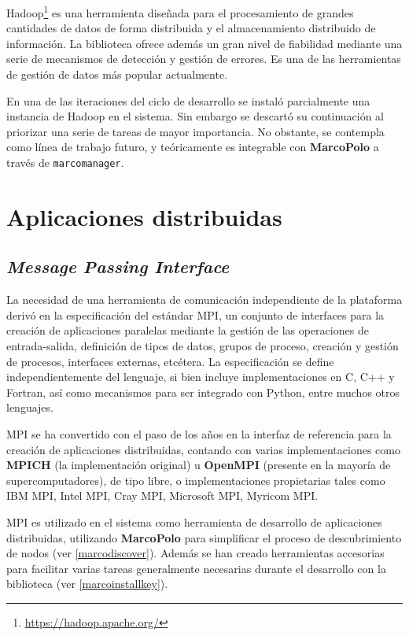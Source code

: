 Hadoop\footnote{\href{https://hadoop.apache.org/}{https://hadoop.apache.org/}} es una herramienta diseñada para el procesamiento de grandes cantidades de datos de forma distribuida y el almacenamiento distribuido de información. La biblioteca ofrece además un gran nivel de fiabilidad mediante una serie de mecanismos de detección y gestión de errores. Es una de las herramientas de gestión de datos más popular actualmente.

En una de las iteraciones del ciclo de desarrollo se instaló parcialmente una instancia de Hadoop en el sistema. Sin embargo se descartó su continuación al priorizar una serie de tareas de mayor importancia. No obstante, se contempla como línea de trabajo futuro, y teóricamente es integrable con \textbf{MarcoPolo} a través de \texttt{marcomanager}.

\section{Aplicaciones distribuidas}

\subsection{\textit{Message Passing Interface}}

La necesidad de una herramienta de comunicación independiente de la plataforma derivó en la especificación del estándar MPI\cite{MPISpec}, un conjunto de interfaces para la creación de aplicaciones paralelas mediante la gestión de las operaciones de entrada-salida, definición de tipos de datos, grupos de proceso, creación y gestión de procesos, interfaces externas, etcétera. La especificación se define independientemente del lenguaje, si bien incluye implementaciones en C, C++ y Fortran, así como mecanismos para ser integrado con Python, entre muchos otros lenguajes.

MPI se ha convertido con el paso de los años en la interfaz de referencia para la creación de aplicaciones distribuidas, contando con varias implementaciones como \textbf{MPICH} (la implementación original) u \textbf{OpenMPI} (presente en la mayoría de supercomputadores), de tipo libre, o implementaciones propietarias tales como IBM MPI, Intel MPI, Cray MPI, Microsoft MPI, Myricom MPI.

MPI es utilizado en el sistema como herramienta de desarrollo de aplicaciones distribuidas, utilizando \textbf{MarcoPolo} para simplificar el proceso de descubrimiento de nodos (ver \ref{marcodiscover}). Además se han creado herramientas accesorias para facilitar varias tareas generalmente necesarias durante el desarrollo con la biblioteca (ver \ref{marcoinstallkey}).

